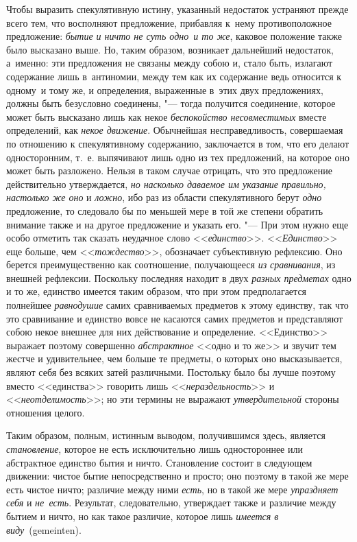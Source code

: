Чтобы выразить спекулятивную истину, указанный недостаток устраняют прежде
всего тем, что восполняют предложение, прибавляя к~нему противоположное
предложение: {\em бытие и ничто не суть одно~и то же}, каковое положение также
было высказано выше. Но, таким образом, возникает дальнейший
недостаток, а~именно: эти предложения не связаны между собою и, стало быть,
излагают содержание лишь в~антиномии, между тем как их содержание ведь
относится к одному~и тому же, и определения, выраженные в~этих двух
предложениях, должны быть безусловно соединены, "--- тогда получится
соединение, которое может быть высказано лишь как некое {\em беспокойство
несовместимых} вместе определений, как {\em некое движение}. Обычнейшая
несправедливость, совершаемая по отношению к спекулятивному содержанию,
заключается в том, что его делают односторонним, т.~е. выпячивают лишь одно из
тех предложений, на которое оно может быть разложено. Нельзя в таком случае
отрицать, что это предложение действительно утверждается, {\em но насколько
даваемое им указание правильно, настолько же оно} и {\em ложно}, ибо раз
из области спекулятивного берут {\em одно} предложение, то следовало бы по
меньшей мере в той же степени обратить внимание также и на другое предложение и
указать его. "--- При этом нужно еще особо отметить так сказать неудачное слово
<<{\em единство}>>. <<{\em Единство}>> еще больше, чем <<{\em тождество}>>,
обозначает субъективную рефлексию. Оно берется преимущественно как соотношение,
получающееся {\em из сравнивания}, из внешней рефлексии. Поскольку последняя
находит в двух {\em разных предметах} одно и то же, единство имеется таким
образом, что при этом предполагается полнейшее {\em равнодушие} самих
сравниваемых предметов к этому единству, так что это сравнивание и единство
вовсе не касаются самих предметов и представляют собою некое внешнее для них
действование и определение. <<Единство>> выражает поэтому совершенно
{\em абстрактное} <<одно и то же>> и звучит тем жестче и удивительнее, чем
больше те предметы, о которых оно высказывается, являют себя без всяких затей
различными. Постольку было бы лучше поэтому вместо <<единства>> говорить лишь
<<{\em нераздельность}>> и <<{\em неотделимость}>>; но эти термины не выражают
{\em утвердительной} стороны отношения целого.

Таким образом, полным, истинным выводом, получившимся здесь, является
{\em становление}, которое не есть исключительно лишь одностороннее или
абстрактное единство бытия и ничто. Становление состоит в следующем движении:
чистое бытие непосредственно и просто; оно поэтому в такой же мере есть чистое
ничто; различие между ними {\em есть}, но в такой же мере {\em упраздняет себя}
и {\em не~есть}. Результат, следовательно, утверждает также и различие между
бытием и ничто, но как такое различие, которое лишь
{\em имеется в виду}~(gemeinten).


